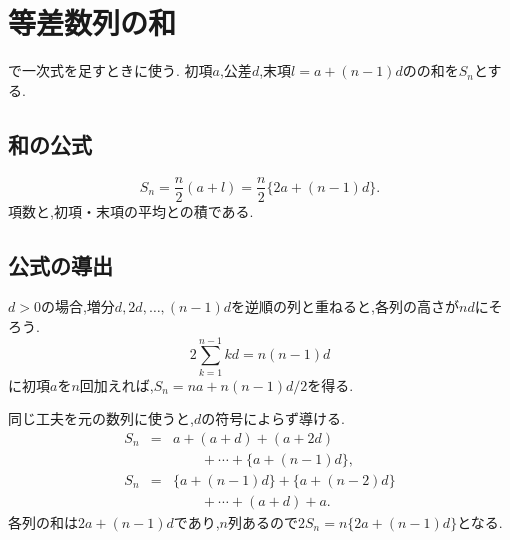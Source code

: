
\section{等差数列の和}\label{節：等差数列とその総和の導出}
  で一次式を足すときに使う.
  初項$a$,公差$d$,末項$l=a+(n-1)d$のの和を$S_n$とする.

  \subsection{和の公式}\label{節：等差数列とその総和の導出：総和の公式}
    \[
      S_n=\frac n2(a+l)=\frac n2\{2a+(n-1)d\}.
    \]
    項数と,初項・末項の平均との積である.

  \subsection{公式の導出}\label{節：等差数列とその総和の導出：公式の導出}
    $d>0$の場合,増分$d,2d,\ldots,(n-1)d$を逆順の列と重ねると,各列の高さが$nd$にそろう.
    \[
      2\sum_{k=1}^{n-1}kd=n(n-1)d
    \]
    に初項$a$を$n$回加えれば,$S_n=na+n(n-1)d/2$を得る.
    \BookFigArithmeticSum

    同じ工夫を元の数列に使うと,$d$の符号によらず導ける.
    \[
      \begin{array}{rcl}
        S_n&=&a+(a+d)+(a+2d)\\
           &&\qquad+\cdots+\{a+(n-1)d\},\\
        S_n&=&\{a+(n-1)d\}+\{a+(n-2)d\}\\
           &&\qquad+\cdots+(a+d)+a.
      \end{array}
    \]
    各列の和は$2a+(n-1)d$であり,$n$列あるので$2S_n=n\{2a+(n-1)d\}$となる.
